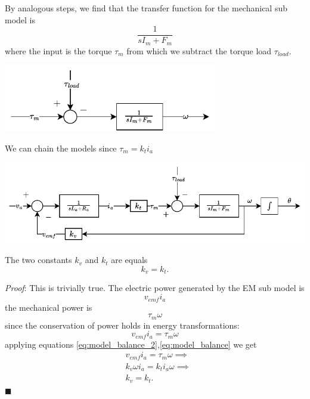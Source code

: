 \documentclass[10pt, letterpaper]{report}
\begin{document}
By analogous steps, we find that the transfer function for the mechanical sub model is\begin{equation}
    \frac{1}{sI_m+F_m}
\end{equation}
where the input is the torque $\tau_m$ from which we subtract the torque load $\tau_{load}$.
\begin{center}
    \includegraphics[width=0.7\textwidth ]{images/Mech_model.drawio.pdf}
\end{center}
We can chain the models since $\tau_m=k_ti_a$\begin{center}
    \includegraphics[width=1\textwidth ]{images/full_model.drawio.pdf}
\end{center}\begin{proposition}
    The two constants $k_v$ and $k_t$ are equals\begin{equation}
        k_v=k_t.
    \end{equation}
\end{proposition}
\textit{Proof}: This is trivially true. The electric power generated by the EM sub model is\begin{equation}
    v_{emf}i_a
\end{equation}
the mechanical power is\begin{equation}
    \tau_m\omega 
\end{equation}
since the conservation of power holds in energy transformations:\begin{equation}
    v_{emf}i_a= \tau_m\omega
\end{equation}
applying equations \eqref{eq:model_balance_2},\eqref{eq:model_balance} we get\begin{align}
    &v_{emf}i_a= \tau_m\omega\implies\\ 
    &k_v\omega i_a= k_ti_a\omega\implies \\ 
    &k_v=k_t. 
\end{align}
\hfill$\blacksquare$
\end{document}
